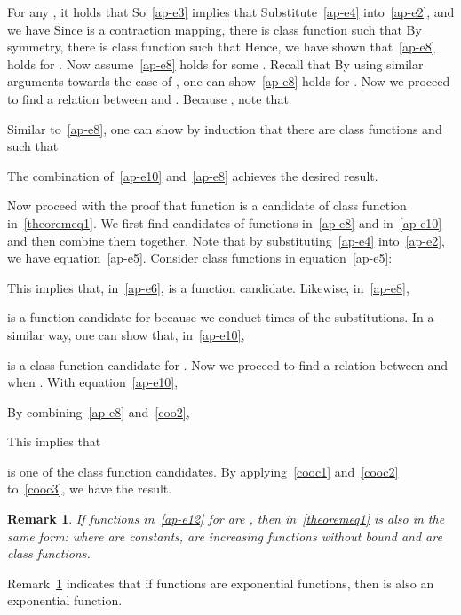 \documentclass[journal]{IEEEtran}
\newtheorem{remark}{\bf Remark}[section]
\newcommand\oprocendsymbol{\hbox{}}
\newcommand\oprocend{\relax\ifmmode\else\unskip\hfill\fi\oprocendsymbol}
\begin{document}
\begin{IEEEproof}
\begin{IEEEproof}
For any , it holds that 
So~\eqref{ap-e3} implies that 
Substitute~\eqref{ap-e4} into~\eqref{ap-e2}, and we have 
Since  is a contraction mapping, there is class  function  such that 
By symmetry, there is class  function  such that  Hence, we have shown that~\eqref{ap-e8} holds for .
Now assume~\eqref{ap-e8} holds for some . Recall that 
 By using similar arguments towards the case of , one can show~\eqref{ap-e8} holds for .
Now we proceed to find a relation between  and .
Because , note that

Similar to~\eqref{ap-e8}, one can show by induction that there are class  functions  and  such that

The combination of~\eqref{ap-e10} and~\eqref{ap-e8} achieves the desired result. \end{IEEEproof}

Now proceed with the proof that function  is a candidate of class  function  in~\eqref{theoremeq1}.
We first find candidates of functions  in~\eqref{ap-e8} and  in~\eqref{ap-e10} and then combine them together.
Note that by substituting~\eqref{ap-e4} into~\eqref{ap-e2}, we have equation~\eqref{ap-e5}.
Consider class  functions in equation~\eqref{ap-e5}:

This implies that, in~\eqref{ap-e6},  is a  function candidate.
Likewise, in~\eqref{ap-e8},

is a  function candidate for  because we conduct  times of the substitutions.
In a similar way, one can show that, in~\eqref{ap-e10},

is a class  function candidate for .
Now we proceed to find a relation between  and  when .
With equation~\eqref{ap-e10},

By combining~\eqref{ap-e8} and~\eqref{coo2}, 

This implies that 

is one of the class  function candidates.
By applying~\eqref{cooc1} and~\eqref{cooc2} to~\eqref{cooc3}, we have the result.
\end{IEEEproof}
\begin{remark}
If functions  in~\eqref{ap-e12} for  are , then  in~\eqref{theoremeq1} is also in the same form: 
where  are constants,  are increasing functions without bound and  are class  functions.
\oprocend
\label{remark:last}
\end{remark}
Remark~\ref{remark:last} indicates that if functions  are exponential functions, then  is also an exponential function.
 
\end{document}
